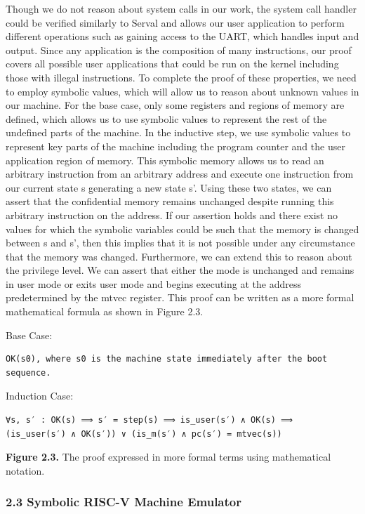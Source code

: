 \documentclass[]{article}
\begin{document}
Though we do not reason about system calls in our work, the system call
handler could be verified similarly to Serval and allows our user
application to perform different operations such as gaining access to
the UART, which handles input and output. Since any application is the
composition of many instructions, our proof covers all possible user
applications that could be run on the kernel including those with
illegal instructions. To complete the proof of these properties, we need
to employ symbolic values, which will allow us to reason about unknown
values in our machine. For the base case, only some registers and
regions of memory are defined, which allows us to use symbolic values to
represent the rest of the undefined parts of the machine. In the
inductive step, we use symbolic values to represent key parts of the
machine including the program counter and the user application region of
memory. This symbolic memory allows us to read an arbitrary instruction
from an arbitrary address and execute one instruction from our current
state s generating a new state s'. Using these two states, we can assert
that the confidential memory remains unchanged despite running this
arbitrary instruction on the address. If our assertion holds and there
exist no values for which the symbolic variables could be such that the
memory is changed between s and s', then this implies that it is not
possible under any circumstance that the memory was changed.
Furthermore, we can extend this to reason about the privilege level. We
can assert that either the mode is unchanged and remains in user mode or
exits user mode and begins executing at the address predetermined by the
mtvec register. This proof can be written as a more formal mathematical
formula as shown in Figure 2.3.

Base Case:

\begin{verbatim}
OK(s0), where s0 is the machine state immediately after the boot sequence.
\end{verbatim}

Induction Case:

\begin{verbatim}
∀s, s′ : OK(s) ⟹ s′ = step(s) ⟹ is_user(s′) ∧ OK(s) ⟹ 
(is_user(s′) ∧ OK(s′)) ∨ (is_m(s′) ∧ pc(s′) = mtvec(s))
\end{verbatim}

\textbf{Figure 2.3.} The proof expressed in more formal terms using
mathematical notation.

\subsubsection{2.3 Symbolic RISC-V Machine
Emulator}\label{symbolic-risc-v-machine-emulator}
\end{document}
